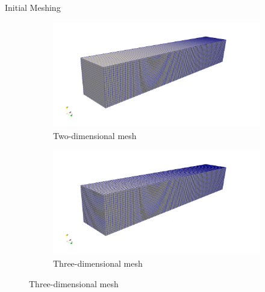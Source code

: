 \begin{frame}{Initial Meshing}
\begin{figure}[]
    \centering
    \begin{subfigure}[]{0.5\textwidth}
        \centering
        \includegraphics[width=\textwidth]{../figs/mesh/2Dmesh.png}
        \caption{Two-dimensional mesh}
    \end{subfigure}%
    \begin{subfigure}[]{0.5\textwidth}
        \centering
        \includegraphics[width=\textwidth]{../figs/mesh/3Dmesh.png}
        \caption{Three-dimensional mesh}
    \end{subfigure}
\end{figure}
\end{frame}

